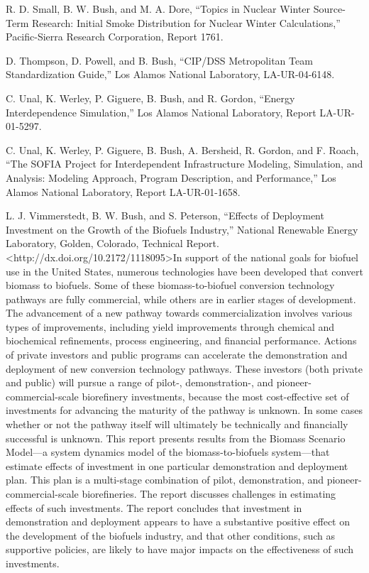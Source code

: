 \documentclass[]{article}
\begin{document}
R. D. Small, B. W. Bush, and M. A. Dore, ``Topics in Nuclear Winter
Source-Term Research: Initial Smoke Distribution for Nuclear Winter
Calculations,'' Pacific-Sierra Research Corporation, Report 1761.

D. Thompson, D. Powell, and B. Bush, ``CIP/DSS Metropolitan Team
Standardization Guide,'' Los Alamos National Laboratory, LA-UR-04-6148.

C. Unal, K. Werley, P. Giguere, B. Bush, and R. Gordon, ``Energy
Interdependence Simulation,'' Los Alamos National Laboratory, Report
LA-UR-01-5297.

C. Unal, K. Werley, P. Giguere, B. Bush, A. Bersheid, R. Gordon, and F.
Roach, ``The SOFIA Project for Interdependent Infrastructure Modeling,
Simulation, and Analysis: Modeling Approach, Program Description, and
Performance,'' Los Alamos National Laboratory, Report LA-UR-01-1658.

L. J. Vimmerstedt, B. W. Bush, and S. Peterson, ``Effects of Deployment
Investment on the Growth of the Biofuels Industry,'' National Renewable
Energy Laboratory, Golden, Colorado, Technical Report.
\textless{}http://dx.doi.org/10.2172/1118095\textgreater{}In support of
the national goals for biofuel use in the United States, numerous
technologies have been developed that convert biomass to biofuels. Some
of these biomass-to-biofuel conversion technology pathways are fully
commercial, while others are in earlier stages of development. The
advancement of a new pathway towards commercialization involves various
types of improvements, including yield improvements through chemical and
biochemical refinements, process engineering, and financial performance.
Actions of private investors and public programs can accelerate the
demonstration and deployment of new conversion technology pathways.
These investors (both private and public) will pursue a range of pilot-,
demonstration-, and pioneer-commercial-scale biorefinery investments,
because the most cost-effective set of investments for advancing the
maturity of the pathway is unknown. In some cases whether or not the
pathway itself will ultimately be technically and financially successful
is unknown. This report presents results from the Biomass Scenario
Model---a system dynamics model of the biomass-to-biofuels system---that
estimate effects of investment in one particular demonstration and
deployment plan. This plan is a multi-stage combination of pilot,
demonstration, and pioneer-commercial-scale biorefineries. The report
discusses challenges in estimating effects of such investments. The
report concludes that investment in demonstration and deployment appears
to have a substantive positive effect on the development of the biofuels
industry, and that other conditions, such as supportive policies, are
likely to have major impacts on the effectiveness of such investments.
\end{document}
